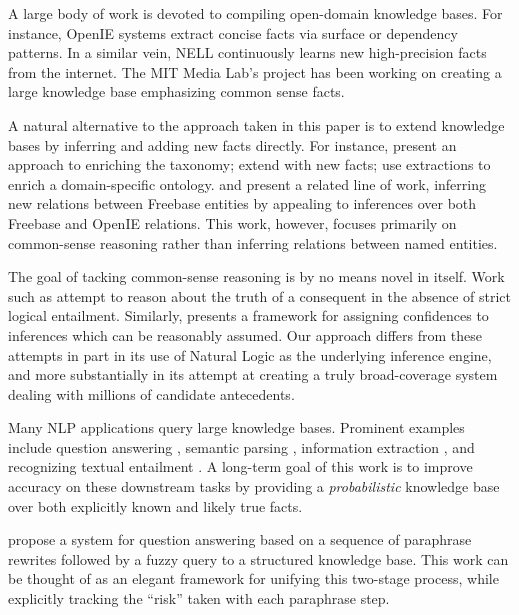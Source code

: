 A large body of work is devoted to compiling open-domain knowledge
  bases.
For instance, OpenIE systems
  \cite{key:2007yates-textrunner,key:2011fader-reverb,key:2012mausam-ollie}
  extract concise facts via surface or dependency patterns.
In a similar vein, NELL \cite{key:2010carlson-nell,key:2013gardnerpra-nell}
  continuously learns new high-precision facts from the internet.
The MIT Media Lab's  project
  \cite{key:2004liu-conceptnet}
  has been working on creating a large knowledge base emphasizing
  common sense facts.

A natural alternative to the approach taken in this paper is to
  extend knowledge bases by inferring and adding new facts directly.
For instance,
   present an approach to enriching 
    the  taxonomy;
   extend  with new facts;
   use  extractions to 
    enrich a domain-specific ontology.
 and 
  present a related line of work, inferring new relations between
  Freebase entities by appealing to inferences over both Freebase and
  OpenIE relations.
This work, however, focuses primarily on common-sense reasoning rather
  than inferring relations between named entities.

The goal of tacking common-sense reasoning is by no means novel in
  itself.
Work such as 
  attempt to reason about the truth of a consequent
  in the absence of strict logical entailment.
Similarly,  presents a framework for
  assigning confidences to inferences which can be reasonably assumed.
Our approach differs from these attempts in part in its use of Natural Logic
  as the underlying inference engine, and more substantially in its
  attempt at creating a truly broad-coverage system dealing with
  millions of candidate antecedents.

Many NLP applications query large knowledge bases.
Prominent examples include
  question answering
    \cite{key:2001voorhees-trec},
  semantic parsing
    \cite{key:1996zelle-semantics,key:2007zettlemoyer-semantics,key:2013kwiatkowski-semantics,key:2014berant-semantics},
  information extraction
    \cite{key:2011hoffman-kbp,key:2012surdeanu-mimlre},
  and recognizing textual entailment
    \cite{key:2010-schoenmackers-horn,key:2011berant-entailment}.
A long-term goal of this work is to improve accuracy on these
  downstream tasks by providing a \textit{probabilistic} knowledge base
  over both explicitly known and likely true facts.

 propose a system for question answering
  based on a sequence of paraphrase rewrites followed by a fuzzy query to
  a structured knowledge base.
This work can be thought of as an elegant framework for unifying this
  two-stage process, while explicitly tracking the ``risk'' taken with
  each paraphrase step.

  
